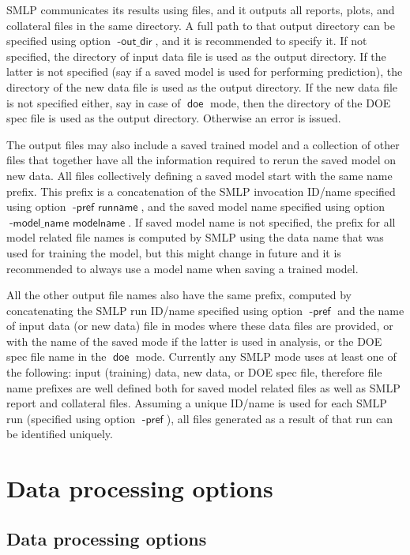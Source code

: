 \documentclass[a4paper,parskip=half]{article} %
\newcommand*\option[1]{\operatorname{\mathsf{#1}}} %
\newcommand*\mode[1]{\operatorname{\mathsf{#1}}} %
\begin{document}
SMLP communicates its results using files, and it outputs all reports, plots, and collateral files in the same directory.
A full path to that output directory can be specified using option $\option{-out\_dir}$, and it is recommended to specify it.
If not specified, the directory of input data file is used as the output directory. 
If the latter is not specified (say if a saved model is used for performing prediction), the directory of the new data 
file is used as the output directory. If the new data file is not specified either, say in case of $\mode{doe}$ mode, 
then the directory of the DOE spec file is used as the output directory. Otherwise an error is issued.

The output files may also include a saved trained model and a collection of other files that together have all the information
required to rerun the saved model on new data. All files collectively defining a saved model start with the same name prefix.
This prefix is a concatenation of the SMLP invocation ID/name specified using option $\option{-pref\,\,runname}$, and the saved
model name specified using option $\option{-model\_name\,\, modelname}$. If saved model name is not specified, the
prefix for all model related file names is computed by SMLP using the data name that was used for training the model, but
this might change in future and it is recommended to always use a model name when saving a trained model. 

All the other output file names also have the same prefix, computed by concatenating the SMLP run ID/name 
specified using option  $\option{-pref}$ and the name of input data (or new data) file in modes where these
data files are provided, or with the name of the saved mode if the latter is used in analysis, or the DOE spec file
name in the $\mode{doe}$ mode. Currently any SMLP mode uses at least one of the following: input (training)
data, new data, or DOE spec file, therefore file name prefixes are well defined both for saved model related files
as well as SMLP report and collateral files. Assuming a unique ID/name is used for each SMLP run (specified
using option $\option{-pref}$), all files generated as a result of that run can be identified uniquely.



\section{Data processing options}\label{sec:data}

\subsection{Data processing options}
\end{document}

